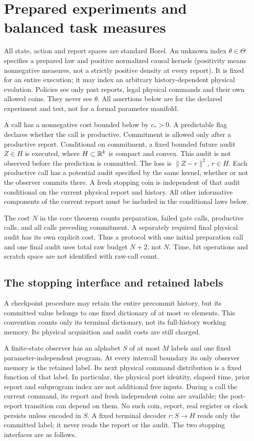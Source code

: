 \section{Prepared experiments and balanced task measures}
\label{sec:experiment}
All state, action and report spaces are standard Borel. An unknown index $\theta\in\Theta$ specifies a prepared law and positive normalized causal kernels (positivity means nonnegative measures, not a strictly positive density at every report). It is fixed for an entire execution; it may index an arbitrary history-dependent physical evolution. Policies see only past reports, legal physical commands and their own allowed coins. They never see $\theta$. All assertions below are for the declared experiment and test, not for a formal parameter manifold.

A call has a nonnegative cost bounded below by $c_*>0$. A predictable flag declares whether the call is productive. Commitment is allowed only after a productive report. Conditional on commitment, a fixed bounded future audit $Z\in H$ is executed, where $H\subset\mathbb R^k$ is compact and convex. This audit is not observed before the prediction is committed. The loss is $\|Z-r\|^2$, $r\in H$. Each productive call has a potential audit specified by the same kernel, whether or not the observer commits there. A fresh stopping coin is independent of that audit conditional on the current physical report and history. All other informative components of the current report must be included in the conditional laws below.

The cost $N$ in the core theorem counts preparation, failed gate calls, productive calls, and all calls preceding commitment. A separately required final physical audit has its own explicit cost. Thus a protocol with one initial preparation call and one final audit uses total raw budget $N+2$, not $N$. Time, bit operations and scratch space are not identified with raw-call count.

\subsection*{The stopping interface and retained labels}
A checkpoint procedure may retain the entire precommit history, but its committed value belongs to one fixed dictionary of at most $m$ elements. This convention counts only its terminal dictionary, not its full-history working memory. Its physical acquisition and audit costs are still charged.

A finite-state observer has an alphabet $S$ of at most $M$ labels and one fixed parameter-independent program. At every intercall boundary its only observer memory is the retained label. Its next physical command distribution is a fixed function of that label. In particular, the physical port identity, elapsed time, prior report and subprogram index are not additional free inputs. During a call the current command, its report and fresh independent coins are available; the post-report transition can depend on them. No such coin, report, real register or clock persists unless encoded in $S$. A fixed terminal decoder $r:S\to H$ reads only the committed label; it never reads the report or the audit. The two stopping interfaces are as follows.

